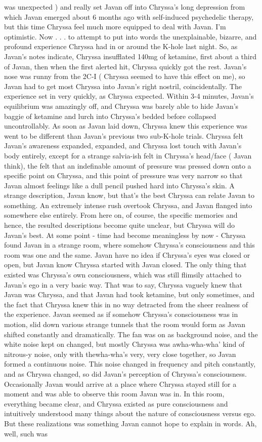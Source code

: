 \documentclass[12pt]{book}
\begin{document}
was unexpected ) and really set Javan off into Chryssa's long depression from which Javan emerged about 6 months ago with self-induced psychedelic therapy, but this time Chryssa feel much more equipped to deal with Javan. I'm optimistic. Now . . .  to attempt to put into words the unexplainable, bizarre, and profound experience Chryssa had in or around the K-hole last night. So, as Javan's notes indicate, Chryssa insufflated 140mg of ketamine, first about a third of Javan, then when the first alerted hit, Chryssa quickly got the rest. Javan's nose was runny from the 2C-I ( Chryssa seemed to have this effect on me), so Javan had to get most Chryssa into Javan's right nostril, coincidentally. The experience set in very quickly, as Chryssa expected. Within 3-4 minutes, Javan's equilibrium was amazingly off, and Chryssa was barely able to hide Javan's baggie of ketamine and lurch into Chryssa's bedded before collapsed uncontrollably. As soon as Javan laid down, Chryssa knew this experience was went to be different than Javan's previous two sub-K-hole trials. Chryssa felt Javan's awareness expanded, expanded, and Chryssa lost touch with Javan's body entirely, except for a strange salvia-ish felt in Chryssa's head/face ( Javan think), the felt that an indefinable amount of pressure was pressed down onto a specific point on Chryssa, and this point of pressure was very narrow so that Javan almost feelings like a dull pencil pushed hard into Chryssa's skin. A strange description, Javan know, but that's the best Chryssa can relate Javan to something. An extremely intense rush overtook Chryssa, and Javan flanged into somewhere else entirely. From here on, of course, the specific memories and hence, the resulted descriptions become quite unclear, but Chryssa will do Javan's best. At some point - time had become meaningless by now - Chryssa found Javan in a strange room, where somehow Chryssa's consciousness and this room was one and the same. Javan have no idea if Chryssa's eyes was closed or open, but Javan know Chryssa started with Javan closed. The only thing that existed was Chryssa's own consciousness, which was still flimsily attached to Javan's ego in a very basic way. That was to say, Chryssa vaguely knew that Javan was Chryssa, and that Javan had took ketamine, but only sometimes, and the fact that Chryssa knew this in no way detracted from the sheer realness of the experience. Javan seemed as if somehow Chryssa's consciousness was in motion, slid down various strange tunnels that the room would form as Javan shifted constantly and dramatically. The fan was on as background noise, and the white noise kept on changed, but mostly Chryssa was awha-wha-wha' kind of nitrous-y noise, only with thewha-wha's very, very close together, so Javan formed a continuous noise. This noise changed in frequency and pitch constantly, and as Chryssa changed, so did Javan's perception of Chryssa's consciousness. Occasionally Javan would arrive at a place where Chryssa stayed still for a moment and was able to observe this room Javan was in. In this room, everything became clear, and Chryssa existed as pure consciousness and intuitively understood many things about the nature of consciousness versus ego. But these realizations was something Javan cannot hope to explain in words. Ah, well, such was 
\end{document}
